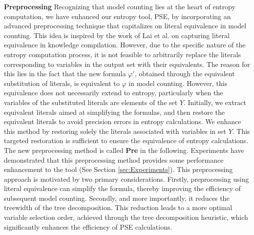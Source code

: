 \textbf{Preprocessing} 
Recognizing that model counting lies at the heart of entropy computation, we have enhanced our entropy tool, PSE, by incorporating an advanced preprocessing technique that capitalizes on literal equivalence in model counting. 
This idea is inspired by the work of Lai et al. \cite{lai2021power} on capturing literal equivalence in knowledge compilation.
However, due to the specific nature of the entropy computation process, it is not feasible to arbitrarily replace the literals corresponding to variables in the output set with their equivalents.
The reason for this lies in the fact that the new formula $\varphi'$, obtained through the equivalent substitution of literals, is equivalent to $\varphi$ in model counting.
However, this equivalence does not necessarily extend to entropy, particularly when the variables of the substituted literals are elements of the set $Y$.
Initially, we extract equivalent literals aimed at simplifying the formulas, and then restore the equivalent literals to avoid precision errors in entropy calculations.
We enhance this method by restoring solely the literals associated with variables in set $Y$. 
This targeted restoration is sufficient to ensure the equivalence of entropy calculations.
The new preprocessing method is called \textbf{Pre} in the following.
Experiments have demonstrated that this preprocessing method provides some performance enhancement to the tool (See Section \ref{sec:Experiments}).
This preprocessing approach is motivated by two primary considerations. 
Firstly, preprocessing using literal equivalence can simplify the formula, thereby improving the efficiency of subsequent model counting. 
Secondly, and more importantly, it reduces the treewidth of the tree decomposition. 
This reduction leads to a more optimal variable selection order, achieved through the tree decomposition heuristic, which significantly enhances the efficiency of PSE calculations.

